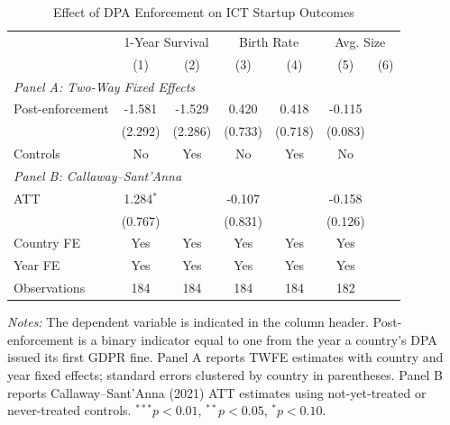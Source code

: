 \begin{table}[t]
\centering
\caption{Effect of DPA Enforcement on ICT Startup Outcomes}
\label{tab:main}
\begin{tabular}{lcccccc}
\hline\hline
 & \multicolumn{2}{c}{1-Year Survival} & \multicolumn{2}{c}{Birth Rate} & \multicolumn{2}{c}{Avg. Size} \\
 & (1) & (2) & (3) & (4) & (5) & (6) \\
\hline
\multicolumn{7}{l}{\textit{Panel A: Two-Way Fixed Effects}} \\
Post-enforcement & -1.581 & -1.529 & 0.420 & 0.418 & -0.115 & \\
 & (2.292) & (2.286) & (0.733) & (0.718) & (0.083) & \\
Controls & No & Yes & No & Yes & No & \\
\hline
\multicolumn{7}{l}{\textit{Panel B: Callaway--Sant'Anna}} \\
ATT & 1.284$^{*}$ & & -0.107 & & -0.158 & \\
 & (0.767) & & (0.831) & & (0.126) & \\
\hline
Country FE & Yes & Yes & Yes & Yes & Yes & \\
Year FE & Yes & Yes & Yes & Yes & Yes & \\
Observations & 184 & 184 & 184 & 184 & 182 & \\

\hline\hline
\end{tabular}
\par\vspace{0.3em}\begin{flushleft}\small
\textit{Notes:} The dependent variable is indicated in the column header. Post-enforcement is a binary indicator equal to one from the year a country's DPA issued its first GDPR fine. Panel A reports TWFE estimates with country and year fixed effects; standard errors clustered by country in parentheses. Panel B reports Callaway--Sant'Anna (2021) ATT estimates using not-yet-treated or never-treated controls. $^{***}p<0.01$, $^{**}p<0.05$, $^{*}p<0.10$.
\end{flushleft}
\end{table}

